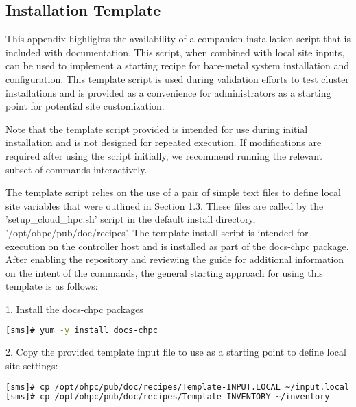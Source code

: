 \renewcommand\thesubsection{\Alph{subsection}}
\subsection{Installation Template}

This appendix highlights the availability of a companion installation script that is included with documentation. This script, when combined with local site inputs, can be used to implement a starting
recipe for bare-metal system installation and configuration. This template script is used during validation efforts to test cluster installations and is provided as a convenience for administrators as a starting point for potential site customization.
\begin{center}
	\begin{tcolorbox}[]
		\small
Note that the template script provided is intended for use during initial installation and is not designed for
repeated execution. If modifications are required after using the script initially, we recommend running the
relevant subset of commands interactively.
\end{tcolorbox}
\end{center}
The template script relies on the use of a pair of simple text files to define local site variables that were outlined
in Section 1.3. These files are called by the 'setup\_cloud\_hpc.sh' script in the default install directory, '/opt/ohpc/pub/doc/recipes'.
The template install script is intended for
execution on the controller host and is installed as part of the docs-chpc package. After enabling the repository and reviewing the guide for additional information on the intent of the commands, the general starting approach for using this template
is as follows:


1. Install the docs-chpc packages

\begin{lstlisting}[language=bash,keywords={},upquote=true]
[sms]# yum -y install docs-chpc
\end{lstlisting}

2. Copy the provided template input file to use as a starting point to define local site settings:

\begin{lstlisting}[language=bash,keywords={},upquote=true]
[sms]# cp /opt/ohpc/pub/doc/recipes/Template-INPUT.LOCAL ~/input.local
[sms]# cp /opt/ohpc/pub/doc/recipes/Template-INVENTORY ~/inventory
\end{lstlisting}

